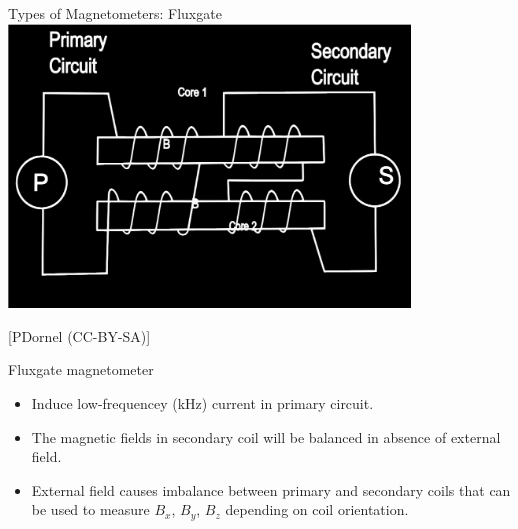 \begin{frame}{Types of Magnetometers: Fluxgate}
     \includegraphics[width=0.8\textwidth]{Figures/Magnetics/Fluxgate_PDornelCCBYSA.png}
 
     \tiny [PDornel (CC-BY-SA)]
 \end{frame}

 \begin{frame}
  \begin{PointSix}{Fluxgate magnetometer}
   \begin{itemize}
    \item Induce low-frequencey (kHz) current in primary circuit.
    \item The magnetic fields in secondary coil will be balanced \alert{in absence of external field.}
    \item External field causes imbalance between primary and secondary coils that can be used to measure $B_x$, $B_y$, $B_z$ \alert{depending on coil orientation.}
   \end{itemize}
  \end{PointSix}
\end{frame}


